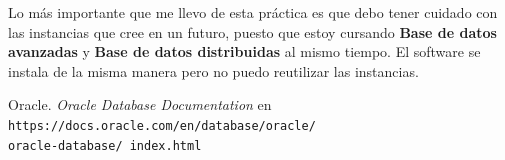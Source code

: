 \documentclass{article}
\begin{document}
Lo más importante que me llevo de esta práctica es que debo tener cuidado con 
las instancias que cree en un futuro, puesto que estoy cursando 
\textbf{Base de datos avanzadas} y \textbf{Base de datos distribuidas} al mismo
tiempo. El software se instala de la misma manera pero no puedo reutilizar 
las instancias.


\renewcommand\refname{Bibliografía}
\begin{thebibliography}{99}
     Oracle. \textit{Oracle Database Documentation} en 
        \texttt{https://docs.oracle.com/en/database/oracle/\\oracle-database/%
        index.html}
\end{thebibliography}
\end{document}

